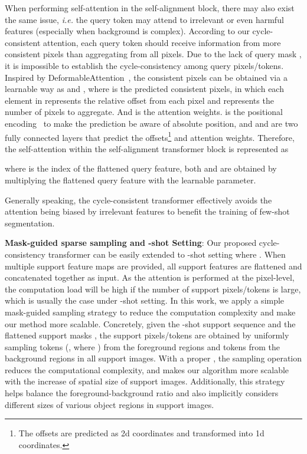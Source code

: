 \documentclass{article}
\begin{document}
When performing self-attention in the self-alignment block, there may also exist the same issue, 
\textit{i.e.} the query token may attend to irrelevant or even harmful features (especially when background is complex). According to our cycle-consistent attention, each query token should receive information from more consistent pixels than aggregating from all pixels. Due to the lack of query mask , it is impossible to establish the cycle-consistency among query pixels/tokens. Inspired by DeformableAttention~\cite{zhu2020deformabledetr}, the consistent pixels can be obtained via a learnable way as
 and , 
where  is the predicted consistent pixels, in which each element  in  represents the relative offset from each pixel and  represents the number of pixels to aggregate. And  is the attention weights.  is the positional encoding~\cite{parmar2018imageTR} to make the prediction be aware of absolute position, and  and  are two fully connected layers that predict the offsets\footnote{The offsets are predicted as 2d coordinates and transformed into 1d coordinates.} and attention weights. Therefore, the self-attention within the self-alignment transformer block is represented as 

where  is the index of the flattened query feature, both  and  are obtained by multiplying the flattened query feature with the learnable parameter.

Generally speaking, the cycle-consistent transformer effectively avoids the attention being biased by irrelevant features to benefit the training of few-shot segmentation.


\textbf{Mask-guided sparse sampling and -shot Setting}: Our proposed cycle-consistency transformer can be easily extended to -shot setting where . When multiple support feature maps are provided, all support features are flattened and concatenated together as input. As the attention is performed at the pixel-level, the computation load will be high if the number of support pixels/tokens is large, which is usually the case under -shot setting.
In this work, we apply a simple mask-guided sampling strategy to reduce the computation complexity and make our method more scalable. Concretely, given the -shot support sequence  and the flattened support masks , the support pixels/tokens are obtained by uniformly sampling  tokens (, where ) from the foreground regions and  tokens from the background regions in all support images. With a proper , the sampling operation reduces the computational complexity, and makes our algorithm more scalable with the increase of spatial size of support images. Additionally, this strategy helps balance the foreground-background ratio and also implicitly considers different sizes of various object regions in support images. 
\end{document}
